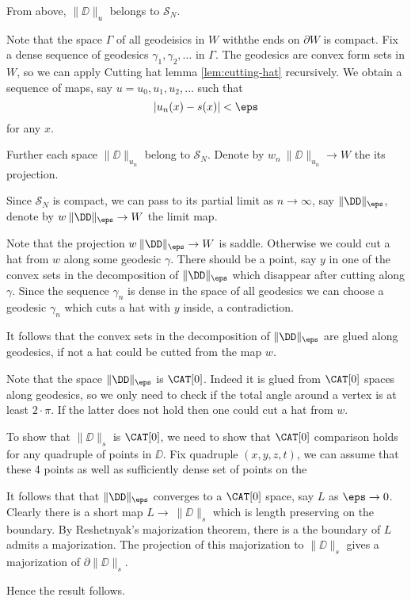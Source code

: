 From above, $\|\DD\|_u$ belongs to $\mathcal{S}_N$.  

Note that the space $\Gamma$ of all geodeisics in $W$ withthe ends on $\partial W$ is compact. 
Fix a dense sequence of geodesics $\gamma_1,\gamma_2,\dots$ in $\Gamma$.
The geodesics are convex form sets in $W$, so we can apply Cutting hat lemma \ref{lem:cutting-hat}
recursively.
We obtain a sequence of maps, say $u=u_0,u_1,u_2,\dots$ such that 
\[|u_n(x)-s(x)|<\eps\]
for any $x$.

Further each space $\|\DD\|_{u_n}$
belong to $\mathcal{S}_N$.
Denote by $w_n\:\|\DD\|_{u_n}\to W$ the its projection.

Since $\mathcal{S}_N$ is compact, we can pass to its partial limit as $n\to\infty$,
say $\|\DD\|_\eps$,
denote by $w\:\|\DD\|_\eps\to W$ the limit map.

Note that the projection $w\:\|\DD\|_\eps\to W$ is saddle.
Otherwise we could cut a hat from $w$ along some geodesic $\gamma$.
There should be a point, say $y$ in one of the convex sets in the decomposition of $\|\DD\|_\eps$ which disappear after cutting along $\gamma$.
Since the sequence $\gamma_n$ is dense in the space of all geodesics
we can choose a geodesic $\gamma_n$ which cuts a hat with $y$ inside, a contradiction.

It follows that the convex sets in the decomposition of $\|\DD\|_\eps$ are glued along geodesics,
if not a hat could be cutted from the map $w$.

Note that the space $\|\DD\|_\eps$ is $\CAT[0]$. 
Indeed it is glued from $\CAT[0]$ spaces along geodesics,
so we only need to check if the total angle around a vertex is at least $2\cdot\pi$.
If the latter does not hold then one could cut a hat from $w$. %

To show that $\|\DD\|_s$ is $\CAT[0]$,
we need to show that $\CAT[0]$ comparison holds for any quadruple of points  in $\DD$.
Fix quadruple $(x,y,z,t)$, we can assume that these 4 points as well as sufficiently dense set of points on the

It follows that that $\|\DD\|_\eps$ converges to a $\CAT[0]$ space, say $L$ as $\eps\to 0$. 
Clearly there is a short map $L\to\ \|\DD\|_s$ which is length preserving on the boundary.
By Reshetnyak's majorization theorem, there is a the boundary of $L$ admits a majorization.
The projection of this majorization to $\|\DD\|_s$ gives a majorization of $\partial\|\DD\|_s$.

Hence the result follows.
\qeds













